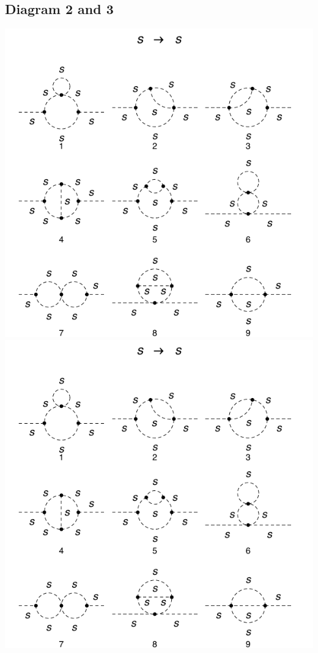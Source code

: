 \documentclass[11pt]{article}
\begin{document}
\subsection*{Diagram 2 and 3}
\noindent\begin{minipage}{0.3\textwidth}
\begin{center}
\includegraphics{2loop_2.pdf}\\
\includegraphics{2loop_3.pdf}\\
\end{center}
\end{minipage}
\end{document}
